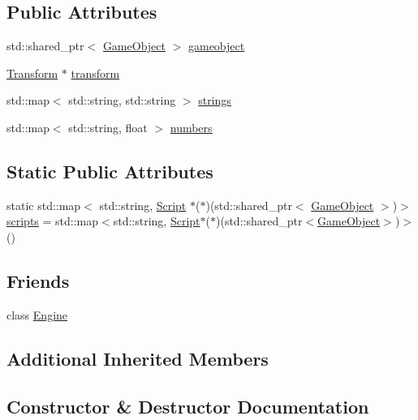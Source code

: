 \subsection*{Public Attributes}
\begin{DoxyCompactItemize}
\item 
std\+::shared\+\_\+ptr$<$ \hyperlink{class_mason_1_1_game_object}{Game\+Object} $>$ \hyperlink{class_mason_1_1_script_a26ffab9ad2a0f22cb6a3cba3029a985f}{gameobject}
\item 
\hyperlink{class_mason_1_1_transform}{Transform} $\ast$ \hyperlink{class_mason_1_1_script_a4ac6ab2299555435468ba62c52ede167}{transform}
\item 
std\+::map$<$ std\+::string, std\+::string $>$ \hyperlink{class_mason_1_1_script_a96f691d0ccd8db2e3e95824e8579cc42}{strings}
\item 
std\+::map$<$ std\+::string, float $>$ \hyperlink{class_mason_1_1_script_a39ec15b6842f815f09537f524c0b0786}{numbers}
\end{DoxyCompactItemize}
\subsection*{Static Public Attributes}
\begin{DoxyCompactItemize}
\item 
static std\+::map$<$ std\+::string, \hyperlink{class_mason_1_1_script}{Script} $\ast$($\ast$)(std\+::shared\+\_\+ptr$<$ \hyperlink{class_mason_1_1_game_object}{Game\+Object} $>$)$>$ \hyperlink{class_mason_1_1_script_a0b74a1b2b601b05841c95b44b329f859}{scripts} = std\+::map$<$std\+::string, \hyperlink{class_mason_1_1_script}{Script}$\ast$($\ast$)(std\+::shared\+\_\+ptr$<$\hyperlink{class_mason_1_1_game_object}{Game\+Object}$>$)$>$()
\end{DoxyCompactItemize}
\subsection*{Friends}
\begin{DoxyCompactItemize}
\item 
class \hyperlink{class_mason_1_1_script_a3e1914489e4bed4f9f23cdeab34a43dc}{Engine}
\end{DoxyCompactItemize}
\subsection*{Additional Inherited Members}


\subsection{Constructor \& Destructor Documentation}
\hypertarget{class_mason_1_1_script_a3d41c440d07b53c15437a13754eff7d0}{}\label{class_mason_1_1_script_a3d41c440d07b53c15437a13754eff7d0} 
